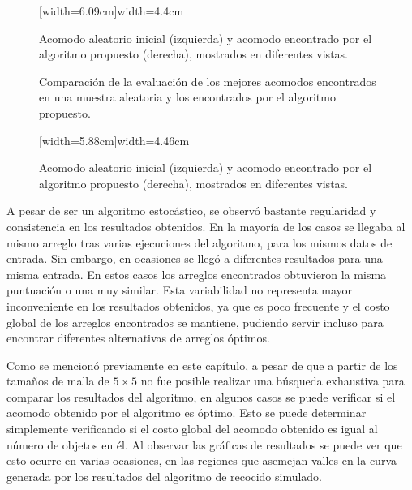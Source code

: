\vfill%
\begin{figure}[H]
	[width=6.09cm]{width=4.4cm}%
	\caption{Acomodo aleatorio inicial (izquierda) y acomodo encontrado por el algoritmo propuesto (derecha), mostrados en diferentes vistas.}%
\end{figure}
%
\setlength\intextsep{6pt}
\begin{figure}[H]
	\caption{Comparación de la evaluación de los mejores acomodos encontrados en una muestra aleatoria y los encontrados por el algoritmo propuesto.}%
\end{figure}
\vfill%
\begin{figure}[H]
	[width=5.88cm]{width=4.46cm}%
	\caption{Acomodo aleatorio inicial (izquierda) y acomodo encontrado por el algoritmo propuesto (derecha), mostrados en diferentes vistas.}%
\end{figure}
\setlength{\intextsep}{\oldintextsep}%
%
A pesar de ser un algoritmo estocástico, se observó bastante regularidad y consistencia en los resultados obtenidos.
En la mayoría de los casos se llegaba al mismo arreglo tras varias ejecuciones del algoritmo, para los mismos datos de entrada.
Sin embargo, en ocasiones se llegó a diferentes resultados para una misma entrada.
En estos casos los arreglos encontrados obtuvieron la misma puntuación o una muy similar.
Esta variabilidad no representa mayor inconveniente en los resultados obtenidos, ya que es poco frecuente y el costo global de los arreglos encontrados se mantiene, pudiendo servir incluso para encontrar diferentes alternativas de arreglos óptimos.

Como se mencionó previamente en este capítulo, a pesar de que a partir de los tamaños de malla de $5\times 5$ no fue posible realizar una búsqueda exhaustiva para comparar los resultados del algoritmo, en algunos casos se puede verificar si el acomodo obtenido por el algoritmo es óptimo.
Esto se puede determinar simplemente verificando si el costo global del acomodo obtenido es igual al número de objetos en él.
Al observar las gráficas de resultados se puede ver que esto ocurre en varias ocasiones, en las regiones que asemejan valles en la curva generada por los resultados del algoritmo de recocido simulado.

